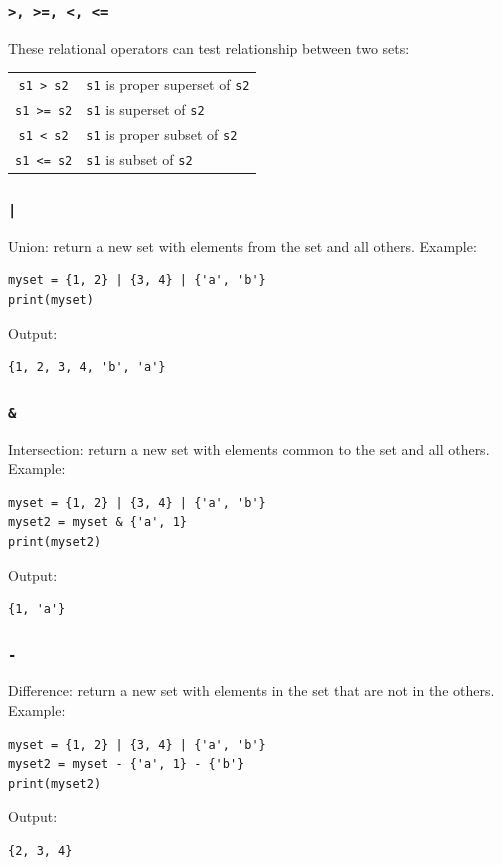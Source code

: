\documentclass[12pt]{book}
\begin{document}
\subsubsection{\texttt{>, >=, <, <=}}
\label{sec:orga032a10}
These relational operators can test relationship between two sets:
\begin{center}
\begin{tabular}{cl}
\hline
\texttt{s1 > s2} & \texttt{s1} is proper superset of \texttt{s2}\\
\texttt{s1 >= s2} & \texttt{s1} is superset of \texttt{s2}\\
\texttt{s1 < s2} & \texttt{s1} is proper subset of \texttt{s2}\\
\texttt{s1 <= s2} & \texttt{s1} is subset of \texttt{s2}\\
\hline
\end{tabular}
\end{center}

\subsubsection{\texttt{|}}
\label{sec:org7ca5a72}
Union: return a new set with elements from the set and all others. Example:
\begin{verbatim}
myset = {1, 2} | {3, 4} | {'a', 'b'}
print(myset)
\end{verbatim}
Output:
\begin{verbatim}
{1, 2, 3, 4, 'b', 'a'}
\end{verbatim}

\subsubsection{\texttt{\&}}
\label{sec:orgba4e8ed}
Intersection: return a new set with elements common to the set and all others. Example:
\begin{verbatim}
myset = {1, 2} | {3, 4} | {'a', 'b'}
myset2 = myset & {'a', 1}
print(myset2)
\end{verbatim}
Output:
\begin{verbatim}
{1, 'a'}
\end{verbatim}

\subsubsection{\texttt{-}}
\label{sec:orge258a36}
Difference: return a new set with elements in the set that are not in the others. Example:
\begin{verbatim}
myset = {1, 2} | {3, 4} | {'a', 'b'}
myset2 = myset - {'a', 1} - {'b'}
print(myset2)
\end{verbatim}
Output:
\begin{verbatim}
{2, 3, 4}
\end{verbatim}
\end{document}
